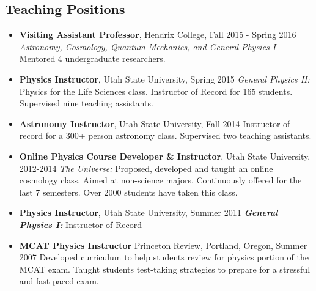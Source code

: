 \documentclass[11pt,letterpaper,sans,unicode]{moderncv}
\newcommand{\blucirc}{{\color{color1} $\circ\;\;$}}
\begin{document}
\subsection{Teaching Positions}
	\renewcommand\labelitemi{\blucirc}
	\begin{itemize}[leftmargin=8mm]
	\setlength\itemsep{1mm}
	\item \textbf{\color{color1} Visiting Assistant Professor}, Hendrix College, \hfill Fall 2015 - Spring 2016
        		\newline  \textit{Astronomy, Cosmology, Quantum Mechanics, and General Physics I}
		\newline Mentored 4 undergraduate researchers.
        \item \textbf{\color{color1} Physics Instructor}, Utah State University, \hfill Spring 2015
        		\newline \textit{General Physics II:} Physics for the Life Sciences class.
		\newline Instructor of Record for 165 students.
		\newline Supervised nine teaching assistants.
        \item \textbf{\color{color1} Astronomy Instructor}, Utah State University, \hfill Fall 2014
        		\newline Instructor of record for a 300+ person astronomy class.
		\newline Supervised two teaching assistants.
        \item \textbf{\color{color1} Online Physics Course Developer \& Instructor}, Utah State University, \hfill 2012-2014
        		\newline \textit{The Universe:} Proposed, developed and taught an online cosmology class.
		\newline Aimed at non-science majors.
		\newline Continuously offered for the last 7 semesters.
		\newline Over 2000 students have taken this class.
        \item \textbf{\color{color1} Physics Instructor}, Utah State University, \hfill Summer 2011
        		\newline \textbf\emph{General Physics I:} Instructor of Record
	\item \textbf{\color{color1} MCAT Physics Instructor} Princeton Review, Portland, Oregon, \hfill Summer 2007
		\newline Developed curriculum to help students review for physics portion of the MCAT exam.
		\newline Taught students test-taking strategies to prepare for a stressful and fast-paced exam.
	\end{itemize}
\end{document}
